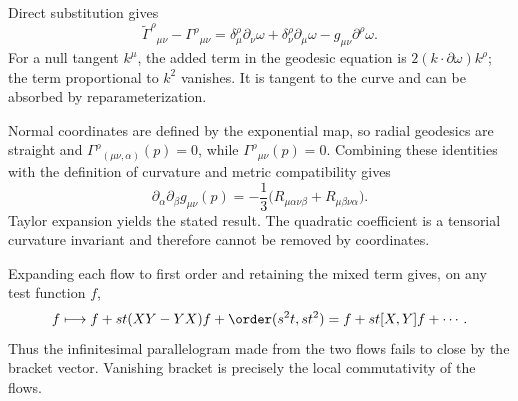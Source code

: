 \begin{solution}
Direct substitution gives
\[
\widetilde\Gamma^\rho{}_{\mu\nu}
-\Gamma^\rho{}_{\mu\nu}
=\delta^\rho_\mu\partial_\nu\omega
+\delta^\rho_\nu\partial_\mu\omega
-g_{\mu\nu}\partial^\rho\omega.
\]
For a null tangent \(k^\mu\), the added term in the geodesic equation is
\(2(k\cdot\partial\omega)k^\rho\); the term proportional to \(k^2\) vanishes.
It is tangent to the curve and can be absorbed by reparameterization.
\end{solution}

\begin{solution}
Normal coordinates are defined by the exponential map, so radial geodesics
are straight and
\(\Gamma^\rho{}_{(\mu\nu,\alpha)}(p)=0\), while
\(\Gamma^\rho{}_{\mu\nu}(p)=0\).  Combining these identities with the
definition of curvature and metric compatibility gives
\[
\partial_\alpha\partial_\beta g_{\mu\nu}(p)
=-\frac13\bigl(R_{\mu\alpha\nu\beta}
+R_{\mu\beta\nu\alpha}\bigr).
\]
Taylor expansion yields the stated result.  The quadratic coefficient is a
tensorial curvature invariant and therefore cannot be removed by coordinates.
\end{solution}

\begin{solution}
Expanding each flow to first order and retaining the mixed term gives, on any
test function \(f\),
\[
f\longmapsto f+st(XY-YX)f+\order(s^2t,st^2)
=f+st[X,Y]f+\cdots.
\]
Thus the infinitesimal parallelogram made from the two flows fails to close by
the bracket vector.  Vanishing bracket is precisely the local commutativity of
the flows.
\end{solution}
